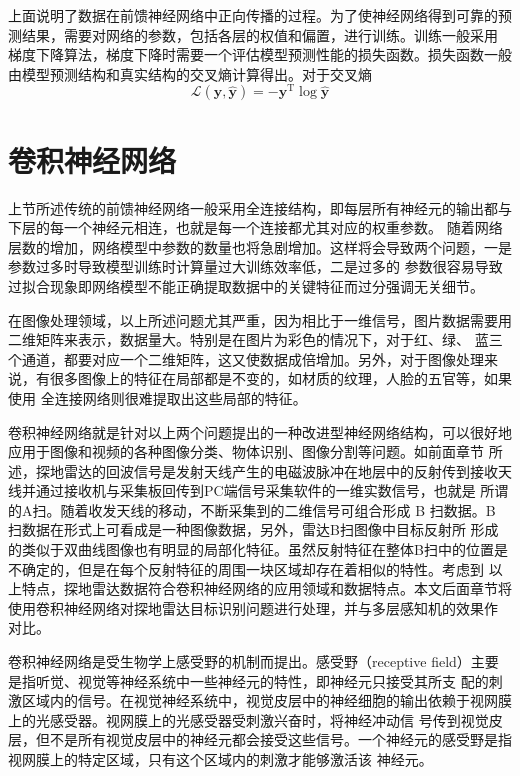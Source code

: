 上面说明了数据在前馈神经网络中正向传播的过程。为了使神经网络得到可靠的预测结果，需要对网络的参数，包括各层的权值和偏置，进行训练。训练一般采用
梯度下降算法，梯度下降时需要一个评估模型预测性能的损失函数。损失函数一般由模型预测结构和真实结构的交叉熵计算得出。对于交叉熵
\begin{equation}
\label{eqn:cross_entrophy} 
\mathcal{L}(\mathbf{y}, \hat{\mathbf{y}})=-\mathbf{y}^{\mathrm{T}} \log \hat{\mathbf{y}}
 \end{equation}

\section{卷积神经网络}
上节所述传统的前馈神经网络一般采用全连接结构，即每层所有神经元的输出都与下层的每一个神经元相连，也就是每一个连接都尤其对应的权重参数。
随着网络层数的增加，网络模型中参数的数量也将急剧增加。这样将会导致两个问题，一是参数过多时导致模型训练时计算量过大训练效率低，二是过多的
参数很容易导致过拟合现象即网络模型不能正确提取数据中的关键特征而过分强调无关细节。

在图像处理领域，以上所述问题尤其严重，因为相比于一维信号，图片数据需要用二维矩阵来表示，数据量大。特别是在图片为彩色的情况下，对于红、绿、
蓝三个通道，都要对应一个二维矩阵，这又使数据成倍增加。另外，对于图像处理来说，有很多图像上的特征在局部都是不变的，如材质的纹理，人脸的五官等，如果使用
全连接网络则很难提取出这些局部的特征。

卷积神经网络就是针对以上两个问题提出的一种改进型神经网络结构，可以很好地应用于图像和视频的各种图像分类、物体识别、图像分割等问题。如前面章节
所述，探地雷达的回波信号是发射天线产生的电磁波脉冲在地层中的反射传到接收天线并通过接收机与采集板回传到PC端信号采集软件的一维实数信号，也就是
所谓的A扫。随着收发天线的移动，不断采集到的二维信号可组合形成 B 扫数据。B 扫数据在形式上可看成是一种图像数据，另外，雷达B扫图像中目标反射所
形成的类似于双曲线图像也有明显的局部化特征。虽然反射特征在整体B扫中的位置是不确定的，但是在每个反射特征的周围一块区域却存在着相似的特性。考虑到
以上特点，探地雷达数据符合卷积神经网络的应用领域和数据特点。本文后面章节将使用卷积神经网络对探地雷达目标识别问题进行处理，并与多层感知机的效果作
对比。

卷积神经网络是受生物学上感受野的机制而提出。感受野（receptive field）主要是指听觉、视觉等神经系统中一些神经元的特性，即神经元只接受其所支
配的刺激区域内的信号。在视觉神经系统中，视觉皮层中的神经细胞的输出依赖于视网膜上的光感受器。视网膜上的光感受器受刺激兴奋时，将神经冲动信
号传到视觉皮层，但不是所有视觉皮层中的神经元都会接受这些信号。一个神经元的感受野是指视网膜上的特定区域，只有这个区域内的刺激才能够激活该
神经元。

